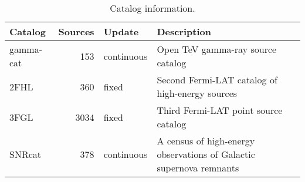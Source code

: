 \begin{table}[tb]

\caption{Catalog information.}
\label{tab:catalogs}
\begin{tabular}{ lrll }
\hline


Catalog & Sources & Update & Description \\ \hline
gamma-cat & 153 & continuous & Open TeV gamma-ray source catalog\\
2FHL & 360 & fixed & Second Fermi-LAT catalog of high-energy sources\\
3FGL & 3034 & fixed & Third Fermi-LAT point source catalog\\
SNRcat & 378 & continuous & A census of high-energy observations of Galactic supernova remnants\\
\hline
\end{tabular}
\end{table}
